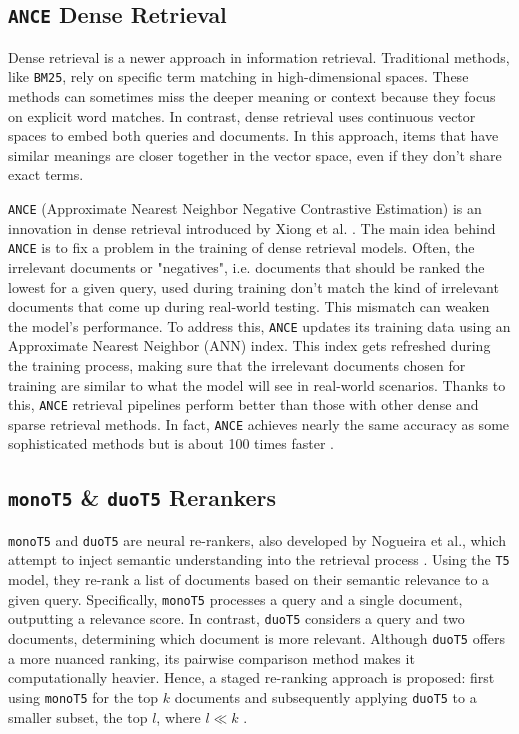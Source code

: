 \documentclass[sigconf]{acmart}
\begin{document}
\subsection{\texttt{ANCE} Dense Retrieval}\label{sec:ance}
Dense retrieval is a newer approach in information retrieval. Traditional methods, like \texttt{BM25}, rely on specific term matching in high-dimensional spaces. These methods can sometimes miss the deeper meaning or context because they focus on explicit word matches. In contrast, dense retrieval uses continuous vector spaces to embed both queries and documents. In this approach, items that have similar meanings are closer together in the vector space, even if they don't share exact terms.

\texttt{ANCE} (Approximate Nearest Neighbor Negative Contrastive Estimation) is an innovation in dense retrieval introduced by Xiong et al. \cite{xiong2020ance}. The main idea behind \texttt{ANCE} is to fix a problem in the training of dense retrieval models. Often, the irrelevant documents or "negatives", i.e. documents that should be ranked the lowest for a given query, used during training don't match the kind of irrelevant documents that come up during real-world testing. This mismatch can weaken the model's performance. To address this, \texttt{ANCE} updates its training data using an Approximate Nearest Neighbor (ANN) index. This index gets refreshed during the training process, making sure that the irrelevant documents chosen for training are similar to what the model will see in real-world scenarios. Thanks to this, \texttt{ANCE} retrieval pipelines perform better than those with other dense and sparse retrieval methods. In fact, \texttt{ANCE} achieves nearly the same accuracy as some sophisticated methods but is about 100 times faster \cite{xiong2020ance}.

\subsection{\texttt{monoT5} \& \texttt{duoT5} Rerankers}\label{sec:rerankers}
\texttt{monoT5} and \texttt{duoT5} are neural re-rankers, also developed by Nogueira et al., which attempt to inject semantic understanding into the retrieval process \cite{nogueira2020document,nogueira2019multi}. Using the \texttt{T5} model, they re-rank a list of documents based on their semantic relevance to a given query. Specifically, \texttt{monoT5} processes a query and a single document, outputting a relevance score. In contrast, \texttt{duoT5} considers a query and two documents, determining which document is more relevant. Although \texttt{duoT5} offers a more nuanced ranking, its pairwise comparison method makes it computationally heavier. Hence, a staged re-ranking approach is proposed: first using \texttt{monoT5} for the top $k$ documents and subsequently applying \texttt{duoT5} to a smaller subset, the top $l$, where $l \ll k$ \cite{nogueira2019multi,pradeep2021expando}.
\end{document}
